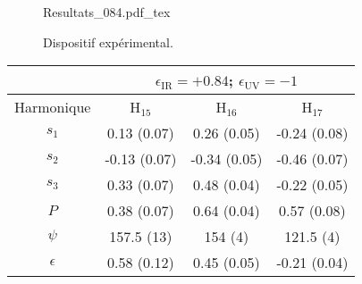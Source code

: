 \begin{figure}
\centering
\def\svgwidth{\textwidth}
{Resultats_084.pdf_tex}
\caption{Dispositif expérimental.}
\label{fig:Resultats_084}
\end{figure}

\begin{table}
\centering
\begin{tabular}{|c||c|c|c|}
\hline
 & \multicolumn{3}{c|}{$\epsilon_{\text{IR}} = +0.84$; $\epsilon_{\text{UV}} = -1$} \\
\hline
Harmonique & H$_{15}$ & H$_{16}$ & H$_{17}$ \\
\hline
$s_1$ & 0.13 (0.07) & 0.26 (0.05) & -0.24 (0.08) \\
\hline
$s_2$ & -0.13 (0.07) & -0.34 (0.05) & -0.46 (0.07)  \\
\hline
$s_3$ & 0.33 (0.07) & 0.48 (0.04) & -0.22 (0.05) \\
\hline
$P$ & 0.38 (0.07) & 0.64 (0.04) & 0.57 (0.08) \\
\hline
$\psi$ & 157.5 (13) & 154 (4) & 121.5 (4) \\
\hline
$\epsilon$ & 0.58 (0.12) & 0.45 (0.05) & -0.21 (0.04) \\
\hline
\end{tabular}
\label{tab:resultats084}
\end{table}